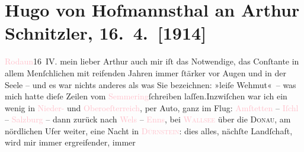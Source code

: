

               \section[Hugo von Hofmannsthal an Arthur Schnitzler, 16. 4. {[}1914{]}]{ Hugo von Hofmannsthal an Arthur Schnitzler, 16. 4. {[}1914{]}}\nopagebreak{}\rehead{ }\normalsize\beginnumbering{} \toendnotes[C]{\smallbreak\pagebreak[2]} 
\toendnotes[C]{\smallbreak}\pstart
           \raggedleft{}{\pb}\textcolor{pink}{Rodaun}{}\ledrightnote{\textcolor{pink}{Rodaun}}{ }16 IV.\pend
           \pstart{}mein lieber Arthur \pend\pstart
           auch mir iſt das Notwendige, das Conſtante in allem Menſchlichen mit reifenden Jahren
               immer ſtärker vor Augen und in der Seele – und es war nichts anderes als was Sie
               bezeichnen: »leiſe Wehmut« – was mich hatte dieſe Zeilen vom \textcolor{pink}{Semmering}{}\ledrightnote{\textcolor{pink}{Semmering}}{ }ſchreiben laſſen.\hspace*{1.5em}Inzwiſchen war ich ein wenig in \textcolor{pink}{Nieder-}{}\ledrightnote{\textcolor{pink}{Niederösterreich}} und \textcolor{pink}{Oberoeſterreich}{}\ledrightnote{\textcolor{pink}{Oberösterreich}}, {\pb}per Auto, ganz im Flug: \textcolor{pink}{Amſtetten}{}\ledrightnote{\textcolor{pink}{Amstetten}} – \textcolor{pink}{Iſchl}{}\ledrightnote{\textcolor{pink}{Bad Ischl}} – \textcolor{pink}{Salzburg}{}\ledrightnote{\textcolor{pink}{Salzburg}} – dann zurück nach \textcolor{pink}{Wels}{}\ledrightnote{\textcolor{pink}{Wels}} – \textcolor{pink}{Enns}{}\ledrightnote{\textcolor{pink}{Enns}}, bei
                  \textcolor{pink}{\textsc{Wallsee}}{}\ledrightnote{\textcolor{pink}{Wallsee}} über die \textsc{Donau}, am nördlichen Ufer weiter, eine Nacht in \textcolor{pink}{\textsc{Dürnstein}}{}\ledrightnote{\textcolor{pink}{Dürnstein}}: dies alles, nächſte Landſchaft, wird mir immer ergreifender, immer
